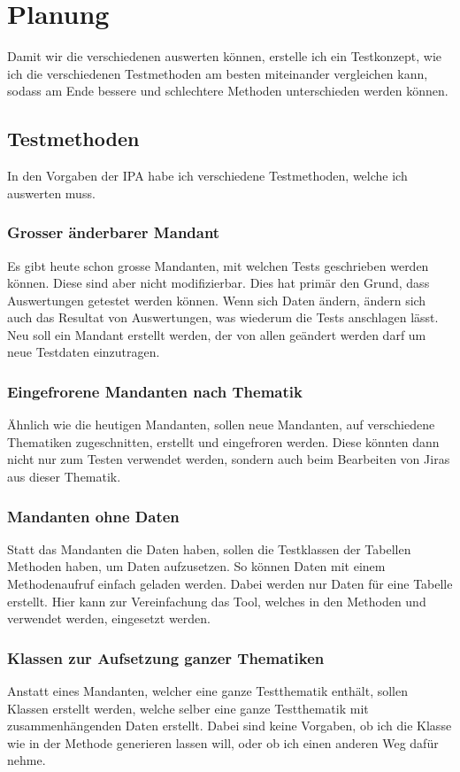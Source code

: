 \section{Planung} \label{Testmöglichkeiten}
Damit wir die verschiedenen  auswerten können, erstelle ich ein Testkonzept, wie ich die verschiedenen Testmethoden am besten miteinander vergleichen kann, sodass am Ende bessere und schlechtere Methoden unterschieden werden können.
\subsection{Testmethoden} 
In den Vorgaben der IPA habe ich verschiedene Testmethoden, welche ich auswerten muss. 
\subsubsection{Grosser änderbarer Mandant}
Es gibt heute schon  grosse Mandanten, mit welchen Tests geschrieben werden können. Diese sind aber nicht modifizierbar. Dies hat primär den Grund, dass Auswertungen getestet werden können. Wenn sich Daten ändern, ändern sich auch das Resultat von Auswertungen, was wiederum die Tests anschlagen lässt. Neu soll ein Mandant erstellt werden, der von allen geändert werden darf um neue Testdaten einzutragen.
\subsubsection{Eingefrorene Mandanten nach Thematik}
Ähnlich wie die heutigen Mandanten, sollen neue Mandanten, auf verschiedene Thematiken zugeschnitten, erstellt und eingefroren werden. Diese könnten dann nicht nur zum Testen verwendet werden, sondern auch beim Bearbeiten von Jiras aus dieser Thematik.
\subsubsection{Mandanten ohne Daten}
Statt das Mandanten die Daten haben, sollen die Testklassen der Tabellen Methoden haben, um Daten aufzusetzen. So können Daten mit einem Methodenaufruf einfach geladen werden. Dabei werden nur Daten für eine Tabelle erstellt. Hier kann zur Vereinfachung das Tool, welches in den Methoden  und  verwendet werden, eingesetzt werden. 
\subsubsection{Klassen zur Aufsetzung ganzer Thematiken}
Anstatt eines Mandanten, welcher eine ganze Testthematik enthält, sollen Klassen erstellt werden, welche selber eine ganze Testthematik mit zusammenhängenden Daten erstellt. Dabei sind keine Vorgaben, ob ich die Klasse wie in der Methode  generieren lassen will, oder ob ich einen anderen Weg dafür nehme.
